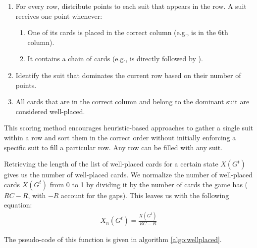 \begin{enumerate}
    \item For every row, distribute points to each suit that appears in the row. A suit receives one point whenever:
    \begin{enumerate}
        \item One of its cards is placed in the correct column (e.g.,  is in the 6th column).
        \item It contains a chain of cards (e.g.,  is directly followed by ).
    \end{enumerate}
    \item Identify the suit that dominates the current row based on their number of points.
    \item All cards that are in the correct column and belong to the dominant suit are considered well-placed.
\end{enumerate}

This scoring method encourages heuristic-based approaches to gather a single suit within a row and sort them in the correct order without initially enforcing a specific suit to fill a particular row. Any row can be filled with any suit.

Retrieving the length of the list of well-placed cards for a certain state $X\left(G^t\right)$ gives us the number of well-placed cards. We normalize the number of well-placed cards $X\left(G^t\right)$ from 0 to 1 by dividing it by the number of cards the game has ($RC - R$, with $-R$ account for the gaps). This leaves us with the following equation:
\begin{align}
X_n\left(G^t\right) = \frac{X\left(G^t\right)}{RC-R}
\end{align}

The pseudo-code of this function is given in algorithm \ref{algo:wellplaced}.


